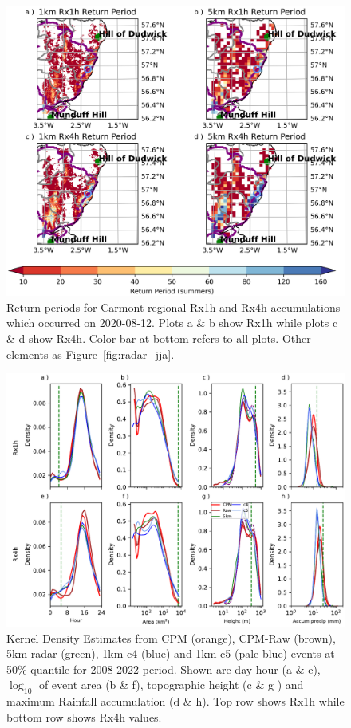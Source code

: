 \documentclass[11pt,a4paper]{article}
\begin{document}
\begin{figure}
	\centering
	\includegraphics[width=\linewidth]{map_return_prds}
	\caption{Return periods for Carmont regional Rx1h and Rx4h accumulations which occurred on 2020-08-12. Plots a \& b show Rx1h while plots c \& d show Rx4h. Color bar at bottom refers to all plots. Other elements as Figure~\ref{fig:radar_jja}. } 
	\label{fig:map_rtn_prd}
\end{figure}


\begin{figure}
	\centering
	\includegraphics[width=\linewidth]{kde_smooth_events}
	\caption{Kernel Density Estimates from  CPM (orange), CPM-Raw (brown), 5km radar (green), 1km-c4 (blue) and 1km-c5 (pale blue) events at 50\% quantile for 2008-2022 period. Shown are day-hour (a \& e),$\log_{10}$ of event area (b \& f),  topographic height (c \& g ) and maximum Rainfall accumulation (d \& h). Top row shows Rx1h while bottom row shows Rx4h values.}
	\label{fig:kde_smooth_events}
\end{figure}
\end{document}
